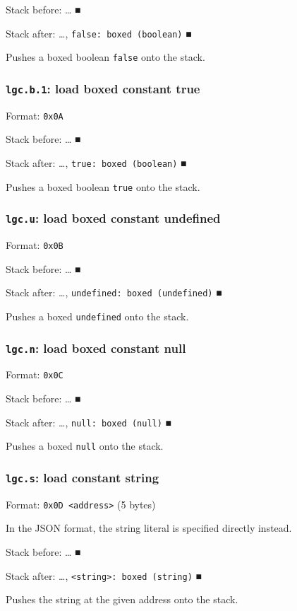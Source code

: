 \documentclass[11pt]{article}
\begin{document}
Stack before: \ldots{}​ ■

Stack after: \ldots{}​, \texttt{false: boxed (boolean)} ■

Pushes a boxed boolean \texttt{false} onto the stack.

\subsubsection{\texttt{lgc.b.1}: load boxed constant true}
\label{sec:org79cc95f}
Format: \texttt{0x0A}

Stack before: \ldots{}​ ■

Stack after: \ldots{}​, \texttt{true: boxed (boolean)} ■

Pushes a boxed boolean \texttt{true} onto the stack.

\subsubsection{\texttt{lgc.u}: load boxed constant undefined}
\label{sec:org5d44e29}
Format: \texttt{0x0B}

Stack before: \ldots{}​ ■

Stack after: \ldots{}​, \texttt{undefined: boxed (undefined)} ■

Pushes a boxed \texttt{undefined} onto the stack.

\subsubsection{\texttt{lgc.n}: load boxed constant null}
\label{sec:org1969f37}
Format: \texttt{0x0C}

Stack before: \ldots{}​ ■

Stack after: \ldots{}​, \texttt{null: boxed (null)} ■

Pushes a boxed \texttt{null} onto the stack.

\subsubsection{\texttt{lgc.s}: load constant string}
\label{sec:org2f69311}
Format: \texttt{0x0D <address>} (5 bytes)

In the JSON format, the string literal is specified directly instead.

Stack before: \ldots{}​ ■

Stack after: \ldots{}​, \texttt{<string>: boxed (string)} ■

Pushes the string at the given address onto the stack.
\end{document}
